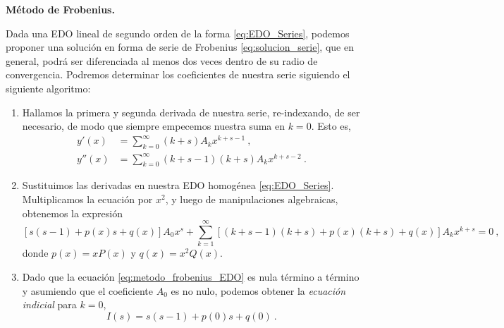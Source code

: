 \begin{propo} 
    \textbf{Método de Frobenius.}

    Dada una EDO lineal de segundo orden de la forma \eqref{eq:EDO_Series}, podemos proponer una solución en forma de serie de Frobenius \eqref{eq:solucion_serie}, que en general, podrá ser diferenciada al menos dos veces dentro de su radio de convergencia. Podremos determinar los coeficientes de nuestra serie siguiendo el siguiente algoritmo:\footnotemark[2]
    \begin{enumerate}
        \item Hallamos la primera y segunda derivada de nuestra serie, re-indexando, de ser necesario, de modo que siempre empecemos nuestra suma en $k=0$. Esto es,
        \begin{align}
            y'(x)  & = \sum_{k=0}^\infty (k+s) A_k x^{k+s-1} 
            \ ,
            \\
            y''(x) & = \sum_{k=0}^\infty (k+s-1)(k+s) A_k x^{k+s-2} \ .
        \end{align}
        \item Sustituimos las derivadas en nuestra EDO homogénea \eqref{eq:EDO_Series}. Multiplicamos la ecuación por $x^2$, y luego de manipulaciones algebraicas, obtenemos la expresión
        \begin{equation}\label{eq:metodo_frobenius_EDO}
            [s(s-1) + p(x)s + q(x)]A_0 x^s + \sum_{k=1}^\infty [(k+s-1)(k+s) + p(x)(k+s) + q(x)]A_k x^{k+s} = 0 \ ,
        \end{equation}
        donde $p(x) = xP(x)$ y $q(x) = x^2 Q(x)$.\footnotemark
        \item Dado que la ecuación \eqref{eq:metodo_frobenius_EDO} es nula término a término y asumiendo que el coeficiente $A_0$ es no nulo, podemos obtener la \emph{ecuación indicial} para $k=0$,
        \begin{equation} \label{eq:ecuacion_indicial}
            I(s) = s(s-1) + p(0)s + q(0) \ .

\end{equation}
\end{enumerate}
\end{propo}
